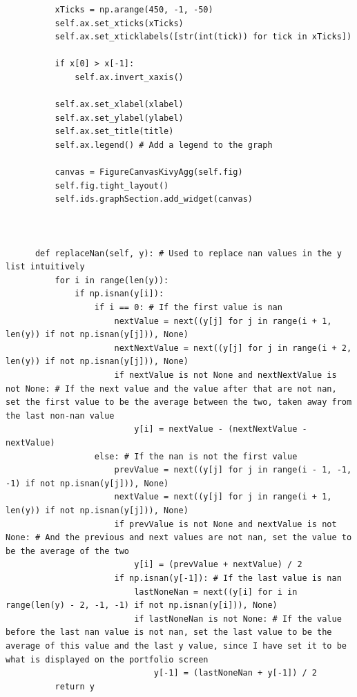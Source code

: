 \documentclass{article}
\begin{document}
\begin{verbatim}
          xTicks = np.arange(450, -1, -50)
          self.ax.set_xticks(xTicks)
          self.ax.set_xticklabels([str(int(tick)) for tick in xTicks])

          if x[0] > x[-1]:
              self.ax.invert_xaxis()

          self.ax.set_xlabel(xlabel)
          self.ax.set_ylabel(ylabel)
          self.ax.set_title(title)
          self.ax.legend() # Add a legend to the graph

          canvas = FigureCanvasKivyAgg(self.fig)
          self.fig.tight_layout()        
          self.ids.graphSection.add_widget(canvas)



      def replaceNan(self, y): # Used to replace nan values in the y list intuitively
          for i in range(len(y)):
              if np.isnan(y[i]):
                  if i == 0: # If the first value is nan
                      nextValue = next((y[j] for j in range(i + 1, len(y)) if not np.isnan(y[j])), None)
                      nextNextValue = next((y[j] for j in range(i + 2, len(y)) if not np.isnan(y[j])), None)
                      if nextValue is not None and nextNextValue is not None: # If the next value and the value after that are not nan, set the first value to be the average between the two, taken away from the last non-nan value
                          y[i] = nextValue - (nextNextValue - nextValue)
                  else: # If the nan is not the first value
                      prevValue = next((y[j] for j in range(i - 1, -1, -1) if not np.isnan(y[j])), None)
                      nextValue = next((y[j] for j in range(i + 1, len(y)) if not np.isnan(y[j])), None)
                      if prevValue is not None and nextValue is not None: # And the previous and next values are not nan, set the value to be the average of the two
                          y[i] = (prevValue + nextValue) / 2 
                      if np.isnan(y[-1]): # If the last value is nan
                          lastNoneNan = next((y[i] for i in range(len(y) - 2, -1, -1) if not np.isnan(y[i])), None) 
                          if lastNoneNan is not None: # If the value before the last nan value is not nan, set the last value to be the average of this value and the last y value, since I have set it to be what is displayed on the portfolio screen
                              y[-1] = (lastNoneNan + y[-1]) / 2
          return y
\end{verbatim}
\vspace{0.5cm}
\end{document}
